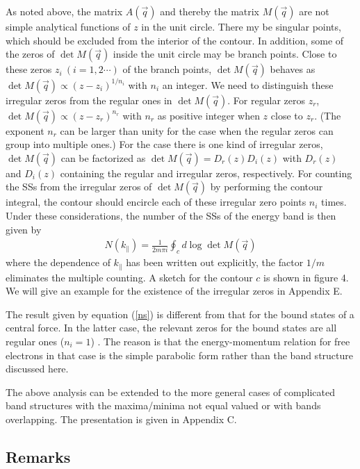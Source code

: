 \documentclass[aps,pra,amsmath,twocolumn,showpacs,bibnotes,10pt]{revtex4-1}
\begin{document}
As noted above, the matrix $A(\vec q)$ and thereby the matrix $M(\vec q)$ are not simple analytical functions of $z$ in the unit circle. There my be singular points, which should be excluded from the interior of the contour. In addition, some of the zeros of $\det M(\vec q)$ inside the unit circle may be branch points. Close to these zeros $z_i~(i=1,2\cdots)$ of the branch points, $\det M(\vec q)$ behaves as $\det M(\vec q) \propto (z-z_i)^{1/n_i}$ with $n_i$ an integer. We need to distinguish these irregular zeros from the regular ones in $\det M(\vec q)$. For regular zeros $z_r$, $\det M(\vec q) \propto (z-z_r)^{n_r}$ with $n_r$ as positive integer when $z$ close to $z_r$. (The exponent $n_r$ can be larger than unity for the case when the regular zeros can group into multiple ones.) For the case there is one kind of irregular zeros, $\det M(\vec q)$ can be factorized as $\det M(\vec q) = D_r(z)D_i(z)$ with $D_r(z)$ and $D_i(z)$ containing the regular and irregular zeros, respectively. For counting the SSs from the irregular zeros of $\det M(\vec q)$ by performing the contour integral, the contour should encircle each of these irregular zero points $n_i$ times. Under these considerations, the number of the SSs of the energy band is then given by
\begin{eqnarray}
N(k_{\parallel}) = \frac{1}{2m\pi i}\oint_c d\log \det M(\vec q)   \label{ns}
\end{eqnarray}
where the dependence of $k_{\parallel}$ has been written out explicitly, the factor $1/m$ eliminates the multiple counting. A sketch for the contour $c$ is shown in figure 4. We will give an example for the existence of the irregular zeros in Appendix E.

The result given by equation (\ref{ns}) is different from that for the bound states of a central force. In the latter case, the relevant zeros for the bound states are all regular ones ($n_i = 1$) \cite{Levinson,Newton}. The reason is that the energy-momentum relation for free electrons in that case is the simple parabolic form rather than the band structure discussed here. 

The above analysis can be extended to the more general cases of complicated band structures with the maxima/minima not equal valued or with bands overlapping. The presentation is given in Appendix C.

\subsection{Remarks}
\end{document}
